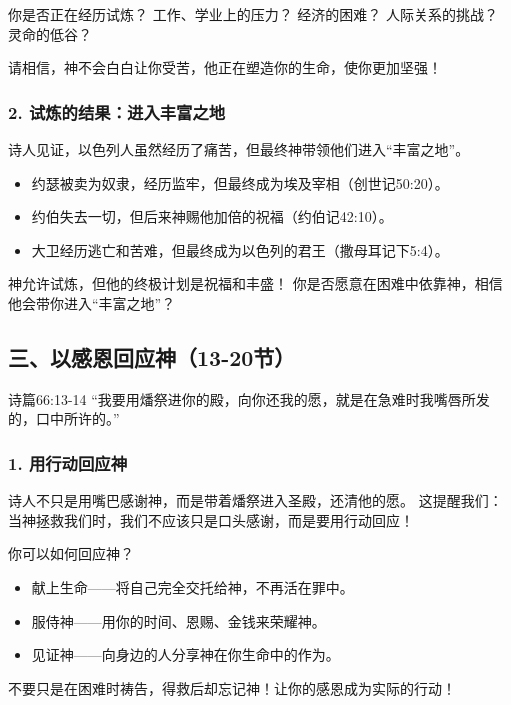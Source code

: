 \documentclass[a4paper, 12pt]{article}
\begin{document}
你是否正在经历试炼？
工作、学业上的压力？
经济的困难？
人际关系的挑战？
灵命的低谷？

请相信，神不会白白让你受苦，他正在塑造你的生命，使你更加坚强！
\subsubsection*{2. 试炼的结果：进入丰富之地}
\hspace{0.6cm}诗人见证，以色列人虽然经历了痛苦，但最终神带领他们进入“丰富之地”。


\begin{itemize}
    \item 约瑟被卖为奴隶，经历监牢，但最终成为埃及宰相（创世记50:20）。

    \item 约伯失去一切，但后来神赐他加倍的祝福（约伯记42:10）。

    \item 大卫经历逃亡和苦难，但最终成为以色列的君王（撒母耳记下5:4）。

\end{itemize}

神允许试炼，但他的终极计划是祝福和丰盛！
你是否愿意在困难中依靠神，相信他会带你进入“丰富之地”？

\subsection*{三、以感恩回应神（13-20节）}
诗篇66:13-14 “我要用燔祭进你的殿，向你还我的愿，就是在急难时我嘴唇所发的，口中所许的。”
\subsubsection*{1. 用行动回应神}
\hspace{0.6cm}诗人不只是用嘴巴感谢神，而是带着燔祭进入圣殿，还清他的愿。
这提醒我们：当神拯救我们时，我们不应该只是口头感谢，而是要用行动回应！

你可以如何回应神？
\begin{itemize}
    \item 献上生命——将自己完全交托给神，不再活在罪中。

    \item 服侍神——用你的时间、恩赐、金钱来荣耀神。

    \item 见证神——向身边的人分享神在你生命中的作为。

\end{itemize}

不要只是在困难时祷告，得救后却忘记神！让你的感恩成为实际的行动！
\end{document}
